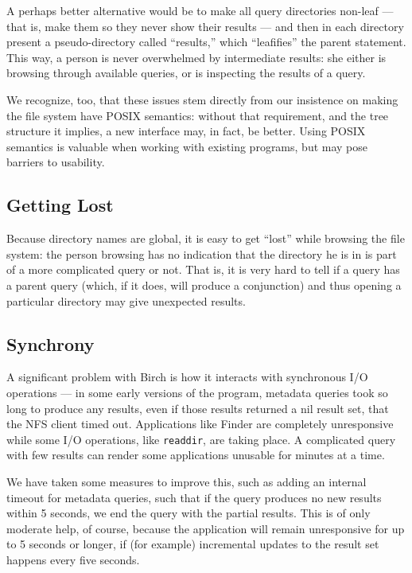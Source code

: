 \documentclass{article}
\begin{document}
A perhaps better alternative would be to make all query directories
non-leaf --- that is, make them so they never show their results ---
and then in each directory present a pseudo-directory called
``results,'' which ``leafifies'' the parent statement. This way, a
person is never overwhelmed by intermediate results: she either is
browsing through available queries, or is inspecting the results of a
query.

We recognize, too, that these issues stem directly from our insistence
on making the file system have POSIX semantics: without that
requirement, and the tree structure it implies, a new interface may,
in fact, be better. Using POSIX semantics is valuable when working
with existing programs, but may pose barriers to usability.

\subsection{Getting Lost}

Because directory names are global, it is easy to get ``lost'' while
browsing the file system: the person browsing has no indication that
the directory he is in is part of a more complicated query or
not. That is, it is very hard to tell if a query has a parent query
(which, if it does, will produce a conjunction) and thus opening a
particular directory may give unexpected results.

\subsection{Synchrony}

A significant problem with Birch is how it interacts with synchronous
I/O operations --- in some early versions of the program, metadata
queries took so long to produce any results, even if those results
returned a nil result set, that the NFS client timed out. Applications
like Finder are completely unresponsive while some I/O operations,
like \texttt{readdir}, are taking place. A complicated query with few
results can render some applications unusable for minutes at a time.

We have taken some measures to improve this, such as adding an
internal timeout for metadata queries, such that if the query produces
no new results within 5 seconds, we end the query with the partial
results. This is of only moderate help, of course, because the
application will remain unresponsive for up to 5 seconds or longer, if
(for example) incremental updates to the result set happens every five
seconds.
\end{document}
